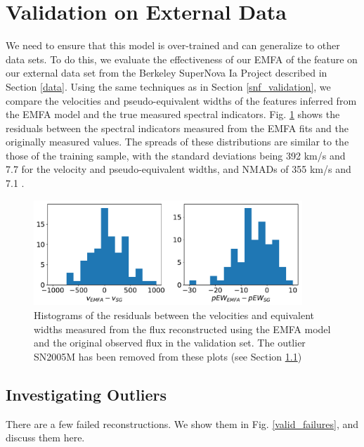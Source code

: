 \section{Validation on External Data}
We need to ensure that this model is over-trained and can generalize to other data sets. To do this, we evaluate the effectiveness of our EMFA of the feature on our external data set from the Berkeley SuperNova Ia Project \citep[BSNIP,][]{silverman_berkeley_2012} described in Section \ref{data}. Using the same techniques as in Section \ref{snf_validation}, we compare the velocities and pseudo-equivalent widths of the features inferred from the EMFA model and the true measured spectral indicators. Fig. \ref{bsnip_hist_resids} shows the residuals between the spectral indicators measured from the EMFA fits and the originally measured values. The spreads of these distributions are similar to the those of the training sample, with the standard deviations being 392 km/s and 7.7 \angstrom\; for the velocity and pseudo-equivalent widths, and NMADs of 355 km/s and 7.1 \angstrom.

\begin{figure}[htbp]
    \centering
    \includegraphics[width=0.9\textwidth]{figures/si_feat_pca/bsnip_recovery_resids.pdf}
    \caption{Histograms of the residuals between the velocities and equivalent widths measured from the flux reconstructed using the EMFA model and the original observed flux in the validation set. The outlier SN2005M has been removed from these plots (see Section \ref{outliers})}
    \label{bsnip_hist_resids}
\end{figure}

\subsection{Investigating Outliers}
\label{outliers}
There are a few failed reconstructions. We show them in Fig. \ref{valid_failures}, and discuss them here.

